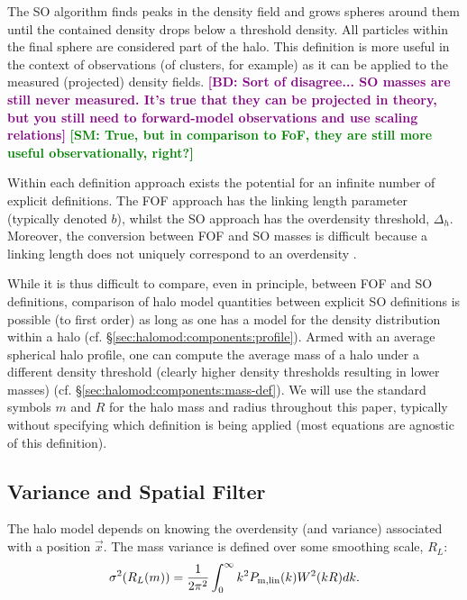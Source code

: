 \documentclass[5p]{elsarticle}
\newcommand{\bd}[1]{\textcolor{purple}{\textbf{[BD: #1]}}}
\newcommand{\sgm}[1]{\textcolor{green}{\textbf{[SM: #1]}}}
\begin{document}
The SO algorithm finds peaks in the density field and grows spheres around them until the contained density drops below a threshold density.
All particles within the final sphere are considered part of the halo. 
This definition is more useful in the context of observations (of clusters, for example) as it can be applied to the measured (projected) density fields. \bd{Sort of disagree... SO masses are still never measured. It's true that they can be projected in theory, but you still need to forward-model observations and use scaling relations} \sgm{True, but in comparison to FoF, they are still more useful observationally, right?}

Within each definition approach exists the potential for an infinite number of explicit definitions. The FOF approach has the linking length parameter (typically denoted $b$), whilst the SO approach has the overdensity threshold, $\Delta_h$. Moreover, the conversion between FOF and SO masses is difficult because a linking length does not uniquely correspond to an overdensity \citep{More2011}.

While it is thus difficult to compare, even in principle, between FOF and SO definitions, comparison of halo model quantities between explicit SO definitions is possible (to first order) as long as one has a model for the density distribution within a halo (cf. \S\ref{sec:halomod:components:profile}).
Armed with an average spherical halo profile, one can compute the average mass of a halo under a different density threshold (clearly higher density thresholds resulting in lower masses) (cf. \S\ref{sec:halomod:components:mass-def}). 
We will use the standard symbols $m$ and $R$ for the halo mass and radius throughout this paper, typically without specifying which definition is being applied (most equations are agnostic of this definition). 


\subsection{Variance and Spatial Filter}
\label{sec:theory:filter}
The halo model depends on knowing the overdensity (and variance) associated with a position $\vec{x}$. 
The mass variance is defined over some smoothing scale, $R_L$:
\begin{equation}
	\label{eq:massvariance}
	\sigma^2(R_L(m)) = \frac{1}{2\pi^2}\int_0^\infty{k^2P_{\rm m, lin}(k)W^2(kR)dk}.
\end{equation}
\end{document}
